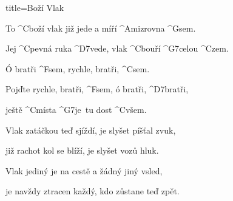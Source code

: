 \begin{song}{title=\predtitle\centering Boží Vlak\\\large \vspace*{-0.3cm}}  %
\begin{centerjustified}
\nejnejvetsi
	
\sloka 
	To ^{C\z}boží vlak již jede a míří ^{Ami\z}zrovna ^{G\z}sem.
	
	Jej ^{C\z }pevná ruka ^{D7\z }vede, vlak ^{C\z}bouří ^{G7\z}celou ^{C\z}zem.
	
	Ó bratři ^{F\z }sem, rychle, bratři, ^{C\z }sem.
	
	Pojďte rychle, bratři, ^{F\z }sem, ó bratři, ^{D7\z}bratři, 
	
	ještě ^{C\z}místa ^{G7\z}je~tu dost ^{C\z}všem.
	
\sloka
	Vlak zatáčkou teď sjíždí, je slyšet píšťal zvuk,
	
	již rachot kol se blíží, je slyšet vozů hluk.
	

\sloka
	Vlak jediný je na cestě a žádný jiný vsled,
	
	je navždy ztracen každý, kdo zůstane teď zpět.
	
\end{centerjustified}
	\setcounter{Slokočet}{0}
\end{song}
